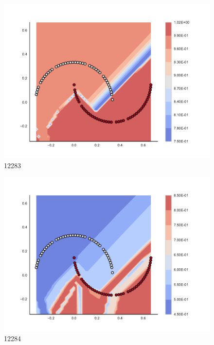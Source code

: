 \begin{subfigure}[b]{0.09\textwidth}
    \includegraphics[clip, trim=2.35cm 1.75cm 4.5cm 0cm,width=\textwidth]{img/convergence/12283.pdf}
    \caption{12283}
    \label{fig:convergence_12283}
\end{subfigure}
%
\begin{subfigure}[b]{0.09\textwidth}
    \includegraphics[clip, trim=2.35cm 1.75cm 4.5cm 0cm,width=\textwidth]{img/convergence/12284.pdf}
    \caption{12284}
    \label{fig:convergence_12284}
\end{subfigure}
%
